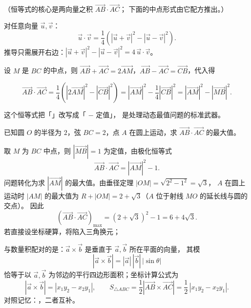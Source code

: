 \begin{explore}

（恒等式的核心是两向量之积 $\overrightarrow{AB}\cdot\overrightarrow{AC}$；
下面的中点形式由它配方推出。）

对任意向量 $\vec u,\vec v$：
\[
  \vec u\cdot\vec v=\frac14\left(|\vec u+\vec v|^2-|\vec u-\vec v|^2\right).
\]
推导只需展开右边：$|\vec u+\vec v|^2-|\vec u-\vec v|^2=4\,\vec u\cdot\vec v$。

设 $M$ 是 $BC$ 的中点，则 $\overrightarrow{AB}+\overrightarrow{AC}=2\overrightarrow{AM}$，$\overrightarrow{AB}-\overrightarrow{AC}=\overrightarrow{CB}$，代入得
\begin{derivation}
\[
  \overrightarrow{AB}\cdot\overrightarrow{AC}
  =\frac14\left(|2\overrightarrow{AM}|^2-|\overrightarrow{CB}|^2\right)
  =|\overrightarrow{AM}|^2-\frac14|\overrightarrow{CB}|^2
  =|\overrightarrow{AM}|^2-|\overrightarrow{MB}|^2.
\]
\end{derivation}
这个恒等式把「」改写成「 $-$ 定值」，
是处理动态最值问题的标准武器。

\begin{example}
已知圆 $O$ 的半径为 $2$，弦 $BC=2$，点 $A$ 在圆上运动，求 $\overrightarrow{AB}\cdot\overrightarrow{AC}$ 的最大值。
\end{example}
\begin{solution}
取 $M$ 为 $BC$ 中点，则 $|\overrightarrow{MB}|=1$ 为定值，由极化恒等式
\[
  \overrightarrow{AB}\cdot\overrightarrow{AC}=|\overrightarrow{AM}|^2-1.
\]
问题转化为求 $|\overrightarrow{AM}|$ 的最大值。由垂径定理 $|OM|=\sqrt{2^2-1^2}=\sqrt3$，
$A$ 在圆上运动时 $|AM|$ 的最大值为 $R+|OM|=2+\sqrt3$（$A$ 位于射线 $MO$ 的延长线与圆的交点）。
因此
\[
  \left(\overrightarrow{AB}\cdot\overrightarrow{AC}\right)_{\max}=(2+\sqrt3)^2-1=6+4\sqrt3.
\]
若直接设坐标硬算，将陷入三角换元；
\end{solution}

与数量积配对的是：$\vec a\times\vec b$ 是垂直于 $\vec a,\vec b$ 所在平面的向量，
其模
\[
  |\vec a\times\vec b|=|\vec a|\,|\vec b|\,|\sin\theta|
\]
恰等于以 $\vec a,\vec b$ 为邻边的平行四边形面积；坐标计算公式为
\[
  |\vec a\times\vec b|=|x_1y_2-x_2y_1|,\qquad
  S_{\triangle ABC}=\frac12|\overrightarrow{AB}\times\overrightarrow{AC}|
  =\frac12\,|x_1y_2-x_2y_1|.
\]
对照记忆：，二者互补。


\end{explore}
